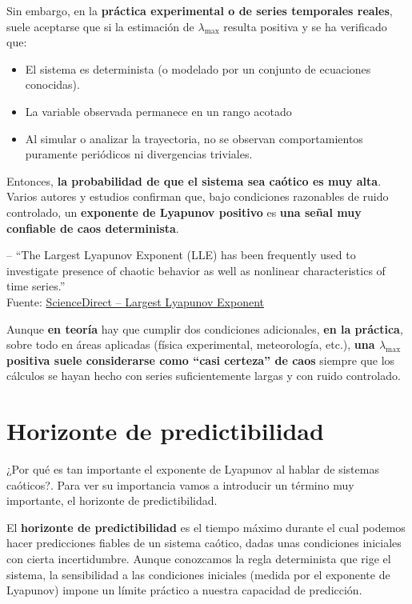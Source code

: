 \documentclass[
  10pt,
  a4paper,
  DIV=11,
  numbers=noendperiod,
  open=any]{scrreprt}
\providecommand{\tightlist}{%
  \setlength{\itemsep}{0pt}\setlength{\parskip}{0pt}}
\numberwithin{equation}{chapter}
\numberwithin{equation}{section}
\renewcommand{\[}{\begin{equation}}
\renewcommand{\]}{\end{equation}}
\begin{document}
Sin embargo, en la \textbf{práctica experimental o de series temporales
reales}, suele aceptarse que si la estimación de \(\lambda_{\max}\)
resulta positiva y se ha verificado que:

\begin{itemize}
\tightlist
\item
  El sistema es determinista (o modelado por un conjunto de ecuaciones
  conocidas).\\
\item
  La variable observada permanece en un rango acotado
\item
  Al simular o analizar la trayectoria, no se observan comportamientos
  puramente periódicos ni divergencias triviales.
\end{itemize}

Entonces, \textbf{la probabilidad de que el sistema sea caótico es muy
alta}. Varios autores y estudios confirman que, bajo condiciones
razonables de ruido controlado, un \textbf{exponente de Lyapunov
positivo} es \textbf{una señal muy confiable de caos determinista}.

-- ``The Largest Lyapunov Exponent (LLE) has been frequently used to
investigate presence of chaotic behavior as well as nonlinear
characteristics of time series.''\\
Fuente:
\href{https://www.sciencedirect.com/topics/engineering/largest-lyapunov-exponent}{ScienceDirect
-- Largest Lyapunov Exponent}

Aunque \textbf{en teoría} hay que cumplir dos condiciones adicionales,
\textbf{en la práctica}, sobre todo en áreas aplicadas (física
experimental, meteorología, etc.), \textbf{una \(\lambda_{\max}\)
positiva suele considerarse como ``casi certeza'' de caos} siempre que
los cálculos se hayan hecho con series suficientemente largas y con
ruido controlado.

\section{Horizonte de
predictibilidad}\label{horizonte-de-predictibilidad}

¿Por qué es tan importante el exponente de Lyapunov al hablar de
sistemas caóticos?. Para ver su importancia vamos a introducir un
término muy importante, el horizonte de predictibilidad.

El \textbf{horizonte de predictibilidad} es el tiempo máximo durante el
cual podemos hacer predicciones fiables de un sistema caótico, dadas
unas condiciones iniciales con cierta incertidumbre. Aunque conozcamos
la regla determinista que rige el sistema, la sensibilidad a las
condiciones iniciales (medida por el exponente de Lyapunov) impone un
límite práctico a nuestra capacidad de predicción.
\end{document}
